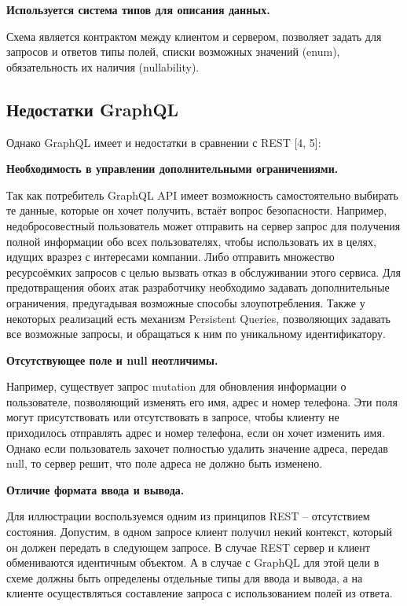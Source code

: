 \textbf{Используется система типов для описания данных.}

Схема является контрактом между клиентом и сервером, позволяет задать для запросов и ответов типы полей, списки возможных значений (enum), обязательность их наличия (nullability).

\subsection{Недостатки GraphQL}\label{subsec:graphql-disadvantages}

Однако GraphQL имеет и недостатки в сравнении с REST [4, 5]:

\textbf{Необходимость в управлении дополнительными ограничениями.}\label{graphql-disadvantage-constraints}

Так как потребитель GraphQL API имеет возможность самостоятельно выбирать те данные, которые он хочет получить, встаёт вопрос безопасности.
Например, недобросовестный пользователь может отправить на сервер запрос для получения полной информации обо всех пользователях, чтобы использовать их в целях, идущих вразрез с интересами компании.
Либо отправить множество ресурсоёмких запросов с целью вызвать отказ в обслуживании этого сервиса.
Для предотвращения обоих атак разработчику необходимо задавать дополнительные ограничения, предугадывая возможные способы злоупотребления.
Также у некоторых реализаций есть механизм Persistent Queries, позволяющих задавать все возможные запросы, и обращаться к ним по уникальному идентификатору.

\textbf{Отсутствующее поле и null неотличимы.}\label{graphql-disadvantage-missing-or-null}

Например, существует запрос mutation для обновления информации о пользователе, позволяющий изменять его имя, адрес и номер телефона.
Эти поля могут присутствовать или отсутствовать в запросе, чтобы клиенту не приходилось отправлять адрес и номер телефона, если он хочет изменить имя.
Однако если пользователь захочет полностью удалить значение адреса, передав null, то сервер решит, что поле адреса не должно быть изменено.

\textbf{Отличие формата ввода и вывода.}\label{graphql-disadvantage-input-output-differ}

Для иллюстрации воспользуемся одним из принципов REST – отсутствием состояния.
Допустим, в одном запросе клиент получил некий контекст, который он должен передать в следующем запросе.
В случае REST сервер и клиент обмениваются идентичным объектом.
А в случае с GraphQL для этой цели в схеме должны быть определены отдельные типы для ввода и вывода, а на клиенте осуществляться составление запроса с использованием полей из ответа.

